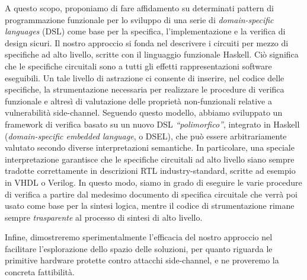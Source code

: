 A questo scopo, proponiamo di fare affidamento su determinati pattern di programmazione 
funzionale per lo sviluppo di una serie di \emph{domain-specific languages} (DSL) come base 
per la specifica, l'implementazione e la verifica di design sicuri.
%
Il nostro approccio si fonda nel descrivere i circuiti per mezzo di specifiche ad alto livello, scritte 
con il linguaggio funzionale Haskell. Ciò significa che %
le specifiche circuitali sono a tutti gli effetti rappresentazioni software eseguibili.
Un tale livello di astrazione %
ci consente di inserire, nel codice delle specifiche, la strumentazione necessaria per realizzare le 
procedure di verifica funzionale e altresì di valutazione delle proprietà non-funzionali relative a 
vulnerabilità side-channel.
%
Seguendo questo modello, 
abbiamo sviluppato un framework di verifica basato su un nuovo DSL \emph{``polimorfico''}, 
integrato in Haskell (\emph{domain-specific embedded language}, o DSEL), che può essere 
arbitrariamente valutato secondo diverse interpretazioni semantiche.
In particolare, una speciale interpretazione garantisce che le specifiche circuitali ad alto livello 
siano sempre tradotte correttamente in descrizioni RTL industry-standard, scritte ad esempio in 
VHDL o Verilog.
In questo modo, siamo in grado di eseguire %
le varie procedure di verifica a partire dal medesimo documento di specifica circuitale che verrà 
poi usato come base per la sintesi logica, mentre %
il codice di strumentazione rimane sempre \emph{trasparente} al processo di sintesi di alto 
livello.

Infine, dimostreremo sperimentalmente l'efficacia del nostro approccio %
nel facilitare l'esplorazione dello spazio delle soluzioni, per quanto riguarda le primitive hardware 
protette contro attacchi side-channel, e ne proveremo la concreta fattibilità.

